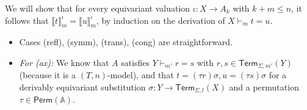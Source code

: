 \documentclass[a4paper,UKenglish,cleveref,thm-restate,numberwithinsect,final]{lipics-v2021}
\newcommand{\Perm}{\mathsf{Perm}(\Names)}
\newcommand{\Term}{\mathsf{Term}}
\newcommand{\sigp}{\Sigma_0}
\newcommand{\sigf}{\Sigma_{\mathsf f}}
\newcommand{\sigb}{\Sigma_{\mathsf b}}
\newcommand{\Names}{\mathbb{A}}
\theoremstyle{plain}
\numberwithin{equation}{section}
\newcommand{\+}[1]{\mathcal{#1}\xspace}
\theoremstyle{definition}
\begin{document}
    We will show that for every equivariant valuation \(\iota: X \to A_k\) with \(k + m \le n\), it follows that \(\llbracket t \rrbracket^\iota_m = \llbracket u \rrbracket^\iota_m\), by induction on the derivation of \(X \vdash_m t = u\).
    \begin{itemize}
        \item
            Cases (refl), (symm), (trans), (cong) are straightforward.
        \item
            \textit{For (ax):}
            We know that \(A\) satisfies \(Y \vdash_{m'} r = s\) with \(r, s \in \Term_{\Sigma, m'}(Y)\) (because it is a \((T, n)\)-model), and that \(t = (\tau r)\sigma, u = (\tau s)\sigma\) for a derivably equivariant substitution \(\sigma: Y \to \Term_{\Sigma, l}(X)\) and a permutation \(\tau \in \Perm\).


\end{itemize}
\end{document}

